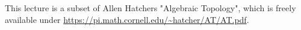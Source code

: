 
This lecture is a subset of Allen Hatchers "Algebraic Topology", which is freely available under 
\url{https://pi.math.cornell.edu/~hatcher/AT/AT.pdf}.